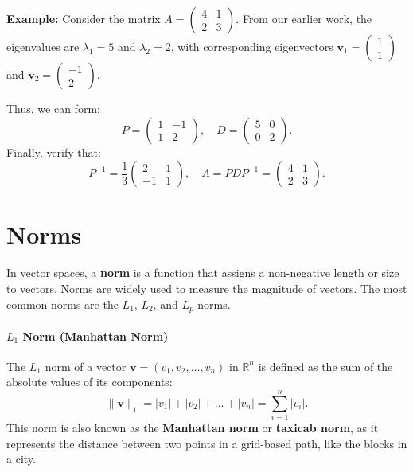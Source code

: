 \documentclass[]{article}
\begin{document}
	\noindent \textbf{Example:}
	Consider the matrix $A = \begin{pmatrix} 4 & 1 \\ 2 & 3 \end{pmatrix}$.
	From our earlier work, the eigenvalues are $\lambda_1 = 5$ and $\lambda_2 = 2$, with corresponding eigenvectors $\mathbf{v}_1 = \begin{pmatrix} 1 \\ 1 \end{pmatrix}$ and $\mathbf{v}_2 = \begin{pmatrix} -1 \\ 2 \end{pmatrix}$.
	
	Thus, we can form:
	$$
	P = \begin{pmatrix} 1 & -1 \\ 1 & 2 \end{pmatrix},
	\quad D = \begin{pmatrix} 5 & 0 \\ 0 & 2 \end{pmatrix}.
	$$
	Finally, verify that:
	$$
	P^{-1} = \frac{1}{3} \begin{pmatrix} 2 & 1 \\ -1 & 1 \end{pmatrix},
	\quad A = PDP^{-1} = \begin{pmatrix} 4 & 1 \\ 2 & 3 \end{pmatrix}.
	$$
	
	
	\section{Norms}
	In vector spaces, a \textbf{norm} is a function that assigns a non-negative length or size to vectors.
	Norms are widely used to measure the magnitude of vectors.
	The most common norms are the $L_1$, $L_2$, and $L_p$ norms.
	
	\paragraph{$L_1$ Norm (Manhattan Norm)}
	The $L_1$ norm of a vector $\mathbf{v} = (v_1, v_2, \dots, v_n)$ in $\mathbb{R}^n$ is defined as the sum of the absolute values of its components:
	$$
	\|\mathbf{v}\|_1 = |v_1| + |v_2| + \dots + |v_n| = \sum_{i=1}^{n} |v_i|.
	$$
	This norm is also known as the \textbf{Manhattan norm} or \textbf{taxicab norm}, as it represents the distance between two points in a grid-based path, like the blocks in a city.
	
\end{document}
